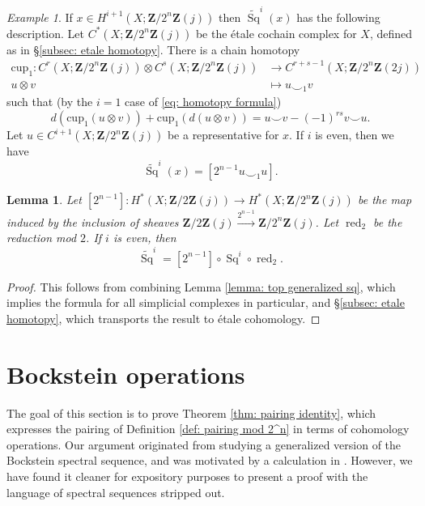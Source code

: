 \documentclass[10pt, reqno]{amsart}
\numberwithin{equation}{subsection}
\newcommand{\wt}[1]{\widetilde{#1}}
\newcommand{\Z}{\mathbf{Z}}
\newcommand{\mrm}[1]{\mathrm{#1}}
\newcommand{\co}{\colon}
\DeclareMathOperator{\et}{\acute{e}t}
\DeclareMathOperator{\Sq}{Sq}
\DeclareMathOperator{\red}{red}
\newtheorem{lemma}[thm]{Lemma}
\theoremstyle{remark}
\newtheorem{example}[thm]{Example}
\begin{document}
\begin{example}\label{lemma: cup-1}
If $x \in H^{i+1}_{\et}(X; \Z/2^n \Z(j))$ then $\wt{\Sq}^{i}(x)$ has the following description. Let $C^*_{\et}(X;\Z/2^n \Z(j)) $ be the \'{e}tale cochain complex for $X$, defined as in \S \ref{subsec: etale homotopy}. There is a chain homotopy 
\begin{align*}
\mrm{cup}_1 \co   C^r_{\et}(X;\Z/2^n \Z(j)) \otimes C^s_{\et}(X; \Z/2^n \Z(j)) &\rightarrow C^{r+s-1}_{\et}(X; \Z/2^n \Z(2j)) \\
u \otimes v & \mapsto u \smile_1 v 
\end{align*}
such that (by the $i=1$ case of \eqref{eq: homotopy formula}) 
\[
d (\mrm{cup}_1(u \otimes v)) +\mrm{cup}_1( d (u \otimes v)) = u \smile v -  (-1)^{rs} v \smile u.
\]
Let $u \in C^{i+1}_{\et}(X; \Z/2^n \Z(j))$ be a representative for $x$. If $i$ is even, then we have
\[
\wt{\Sq}^{i}(x) = [2^{n-1}u \smile_1 u].
\]
\end{example}



\begin{lemma}\label{lemma: etale generalized sq}
Let $[2^{n-1}] \co H^*_{\et}(X; \Z/2\Z(j)) \rightarrow H^*_{\et}(X; \Z/2^n\Z(j))$ be the map induced by the inclusion of sheaves $\Z/2\Z(j) \xrightarrow{2^{n-1}} \Z/2^{n} \Z(j)$.
Let $\red_2$ be the reduction mod $2$. If $i$ is even, then 
\[
\wt{\Sq}^i = [2^{n-1}] \circ \Sq^i \circ \red_2.
\] 
\end{lemma}

\begin{proof}
This follows from combining Lemma \ref{lemma: top generalized sq}, which implies the formula for all simplicial complexes in particular, and \S \ref{subsec: etale homotopy}, which transports the result to \'{e}tale cohomology.
\end{proof}






 
\section{Bockstein operations}\label{sec: bockstein}

The goal of this section is to prove Theorem \ref{thm: pairing identity}, which expresses the pairing of Definition \ref{def: pairing mod 2^n} in terms of cohomology operations. Our argument originated from studying a generalized version of the Bockstein spectral sequence, and was motivated by a calculation in \cite{Browd61}. However, we have found it cleaner for expository purposes to present a proof with the language of spectral sequences stripped out. 
\end{document}
